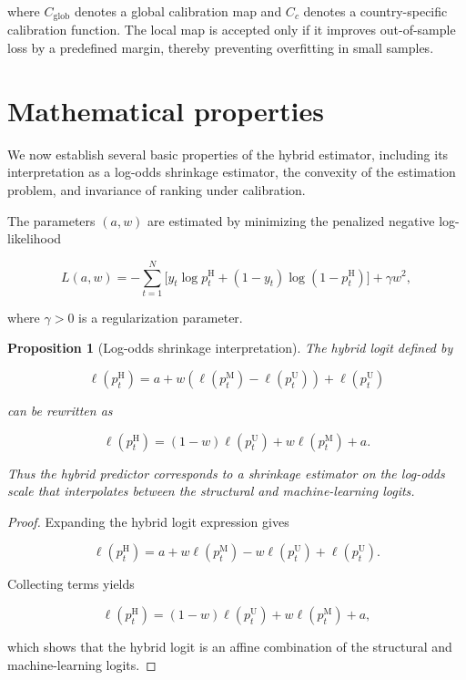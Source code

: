 \documentclass[a4paper,fleqn]{cas-dc}
\newtheorem{proposition}{Proposition}
\begin{document}
	where $C_{\mathrm{glob}}$ denotes a global calibration map and $C_c$ denotes a country-specific calibration function. The local map is accepted only if it improves out-of-sample loss by a predefined margin, thereby preventing overfitting in small samples.
\section{Mathematical properties}

We now establish several basic properties of the hybrid estimator, including its interpretation as a log-odds shrinkage estimator, the convexity of the estimation problem, and invariance of ranking under calibration.

The parameters $(a,w)$ are estimated by minimizing the penalized negative log-likelihood

\begin{equation}
	L(a,w)
	=
	-\sum_{t=1}^{N}
	\Big[
	y_t\log p_t^{\mathrm{H}}
	+
	(1-y_t)\log(1-p_t^{\mathrm{H}})
	\Big]
	+
	\gamma w^2,
\end{equation}

where $\gamma>0$ is a regularization parameter.

\begin{proposition}[Log-odds shrinkage interpretation]
	
	The hybrid logit defined by
	
	\[
	\ell(p_t^{\mathrm{H}})
	=
	a+w(\ell(p_t^{\mathrm{M}})-\ell(p_t^{\mathrm{U}}))+\ell(p_t^{\mathrm{U}})
	\]
	
	can be rewritten as
	
	\[
	\ell(p_t^{\mathrm{H}})
	=
	(1-w)\ell(p_t^{\mathrm{U}})+w\ell(p_t^{\mathrm{M}})+a .
	\]
	
	Thus the hybrid predictor corresponds to a shrinkage estimator on the log-odds scale that interpolates between the structural and machine-learning logits.
	
\end{proposition}

\begin{proof}
	
	Expanding the hybrid logit expression gives
	
	\[
	\ell(p_t^{\mathrm{H}})
	=
	a+w\ell(p_t^{\mathrm{M}})-w\ell(p_t^{\mathrm{U}})+\ell(p_t^{\mathrm{U}}).
	\]
	
	Collecting terms yields
	
	\[
	\ell(p_t^{\mathrm{H}})
	=
	(1-w)\ell(p_t^{\mathrm{U}})+w\ell(p_t^{\mathrm{M}})+a,
	\]
	
	which shows that the hybrid logit is an affine combination of the structural and machine-learning logits.
	
\end{proof}
\end{document}
